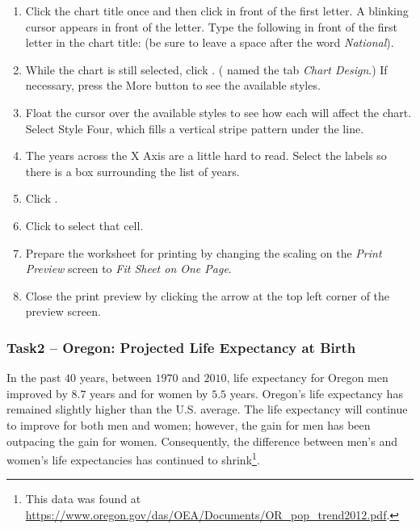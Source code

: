 \begin{enumbox}
\begin{enumerate}
		\item Click the chart title once and then click in front of the first letter. A blinking cursor appears in front of the letter. Type the following in front of the first letter in the chart title:  (be sure to leave a space after the word \textit{National}).
		\item While the chart is still selected, click . ( named the tab \textit{Chart Design}.) If necessary, press the More button to see the available styles.
		\item Float the cursor over the available styles to see how each will affect the chart. Select Style Four, which fills a vertical stripe pattern under the line.
		\item The years across the X Axis are a little hard to read. Select the labels so there is a box surrounding the list of years. 
		\item Click .
		\item Click  to select that cell.
		\item Prepare the  worksheet for printing by changing the scaling on the \textit{Print Preview} screen to \textit{Fit Sheet on One Page}.
		\item Close the print preview by clicking the arrow at the top left corner of the preview screen.
	\end{enumerate}
\end{enumbox}

\subsubsection{Task2 – Oregon: Projected Life Expectancy at Birth}

In the past $ 40 $ years, between $ 1970 $ and $ 2010 $, life expectancy for Oregon men improved by $ 8.7 $ years and for women by $ 5.5 $ years. Oregon's life expectancy has remained slightly higher than the U.S. average. The life expectancy will continue to improve for both men and women; however, the gain for men has been outpacing the gain for women. Consequently, the difference between men's and women's life expectancies has continued to shrink\footnote{This data was found at \url{https://www.oregon.gov/das/OEA/Documents/OR_pop_trend2012.pdf}.}.

